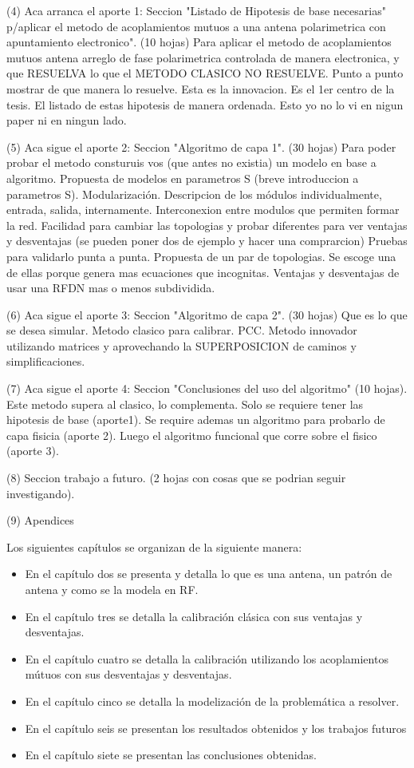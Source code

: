  (4) Aca arranca el aporte 1: Seccion "Listado de Hipotesis de base necesarias" p/aplicar el metodo de acoplamientos mutuos a una antena polarimetrica con apuntamiento electronico". (10 hojas)
 Para aplicar el metodo de acoplamientos mutuos antena arreglo de fase polarimetrica controlada de manera electronica, y que RESUELVA lo que el METODO CLASICO NO RESUELVE. Punto a punto mostrar de que manera lo resuelve. Esta es la innovacion. Es el 1er centro de la tesis. El listado de estas hipotesis de manera ordenada. Esto yo no lo vi en nigun paper ni en ningun lado.
 
 (5) Aca sigue el aporte 2: Seccion "Algoritmo de capa 1".  (30 hojas)
 Para poder probar el metodo consturuis vos (que antes no existia) un modelo en base a algoritmo.
 Propuesta de modelos en parametros S (breve introduccion a parametros S). Modularización. Descripcion de los módulos individualmente, entrada, salida, internamente. Interconexion entre modulos que permiten formar la red. Facilidad para cambiar las topologias y probar diferentes para ver ventajas y desventajas (se pueden poner dos de ejemplo y hacer una comprarcion) Pruebas para validarlo punta a punta.
 Propuesta de un par de topologias. Se escoge una de ellas porque genera mas ecuaciones que incognitas. Ventajas y desventajas de usar una RFDN mas o menos subdividida.
 
 (6) Aca sigue el aporte 3: Seccion "Algoritmo de capa 2". (30 hojas)
 Que es lo que se desea simular.
 Metodo clasico para calibrar. PCC.
 Metodo innovador utilizando matrices y aprovechando la SUPERPOSICION de caminos y simplificaciones.
 
 (7) Aca sigue el aporte 4: Seccion "Conclusiones del uso del algoritmo" (10 hojas).
 Este metodo supera al clasico, lo complementa. Solo se requiere tener las hipotesis de base (aporte1). Se require ademas un algoritmo para probarlo de capa fisicia (aporte 2). Luego el algoritmo funcional que corre sobre el fisico (aporte 3).
 
 (8) Seccion trabajo a futuro. (2 hojas con cosas que se podrian seguir investigando).
 
 (9) Apendices


Los siguientes capítulos se organizan de la siguiente manera: 
\begin{itemize}
	\item En el capítulo dos se presenta y detalla lo que es una antena, un patrón de antena y como se la modela en RF.
	\item En el capítulo tres se detalla la calibración clásica con sus ventajas y desventajas.
	\item En el capítulo cuatro se detalla la calibración utilizando los acoplamientos mútuos con sus desventajas y desventajas.
	\item En el capítulo cinco se detalla la modelización de la problemática a resolver. 
	\item En el capítulo seis se presentan los resultados obtenidos y los trabajos futuros 
	\item En el capítulo siete se presentan las conclusiones obtenidas.
\end{itemize}

